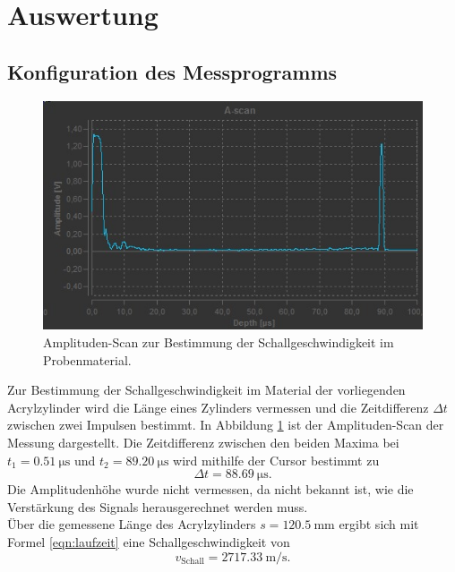 \section{Auswertung}
\label{sec:Auswertung}
\FloatBarrier
\subsection{Konfiguration des Messprogramms}
\begin{figure}
  \centering
  \includegraphics[width=\textwidth]{Messdaten/a.jpg}
  \caption{Amplituden-Scan zur Bestimmung der Schallgeschwindigkeit im Probenmaterial.}
  \label{fig:a1}
\end{figure}
Zur Bestimmung der Schallgeschwindigkeit im Material der vorliegenden Acrylzylinder wird die Länge eines Zylinders vermessen und die Zeitdifferenz $\Delta t$ zwischen zwei Impulsen bestimmt.
In Abbildung \ref{fig:a1} ist der Amplituden-Scan der Messung dargestellt.
Die Zeitdifferenz zwischen den beiden Maxima bei $t_1=\SI{0.51}{\micro\second}$ und $t_2=\SI{89.20}{\micro\second}$ wird mithilfe der Cursor bestimmt zu
\begin{equation}
  \Delta t=\SI{88.69}{\micro\second} \text{.}
\end{equation}
Die Amplitudenhöhe wurde nicht vermessen, da nicht bekannt ist, wie die Verstärkung des Signals herausgerechnet werden muss.\\
Über die gemessene Länge des Acrylzylinders $s=\SI{120.5}{\milli\meter}$ ergibt sich mit Formel \eqref{eqn:laufzeit} eine Schallgeschwindigkeit von
\begin{equation}
  v_{\mathrm{Schall}}=\SI{2717.33}{\meter\per\second} \text{.}
\end{equation}
